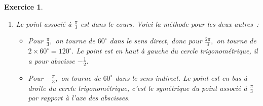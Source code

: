 \documentclass[10pt]{article}
\newtheorem{exo}{Exercice}
\begin{document}
\begin{exo}
\begin{enumerate}
\begin{multicols}{2}
\end{multicols}

Par lecture du cercle trigonométrique~:



\begin{multicols}{4}
$\cos 0=1$

$\sin 0=0$


\columnbreak
$\cos \pi=-1$

$\sin \pi=0$

\columnbreak

$\cos 5\pi=-1$

$\sin 5\pi=0$

\columnbreak

$\cos \frac{\pi}{2}=0$

$\sin \frac{\pi}{2}=1$

\end{multicols}

 

\item \begin{multicols}{2} Le point associé à $\frac{\pi} {3}$ est dans le cours. Voici la méthode pour les deux autres~:

\begin{itemize}
\item[\textbullet] Pour $\frac{\pi} {3},$ on tourne de $60^{\circ}$ dans le sens direct, donc pour $\frac{2\pi}{3},$ on tourne de $2\times 60^{\circ}=120^{\circ}.$ Le point est en haut à gauche du cercle trigonométrique, il a pour abscisse $-\frac{1}{2}.$
\item[\textbullet] Pour $-\frac{\pi} {3},$ on tourne de $60^{\circ}$ dans le sens indirect. Le point est en bas à droite du cercle trigonométrique, c'est le symétrique du point associé à $\frac{\pi}{3}$ par rapport à l'axe des abscisses.
\end{itemize}

\vspace*{1cm}
\columnbreak



\end{multicols}
\end{enumerate}
\end{exo}
\end{document}
